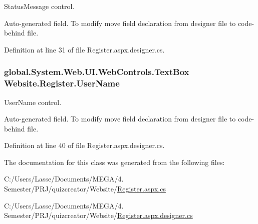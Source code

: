 Status\+Message control. 

Auto-\/generated field. To modify move field declaration from designer file to code-\/behind file. 

Definition at line 31 of file Register.\+aspx.\+designer.\+cs.

\hypertarget{class_website_1_1_register_a76706d63e50874d2759d6a1977fa5615}{}
\subsubsection[{User\+Name}]{\setlength{\rightskip}{0pt plus 5cm}global.\+System.\+Web.\+U\+I.\+Web\+Controls.\+Text\+Box Website.\+Register.\+User\+Name\hspace{0.3cm}{\ttfamily [protected]}}\label{class_website_1_1_register_a76706d63e50874d2759d6a1977fa5615}


User\+Name control. 

Auto-\/generated field. To modify move field declaration from designer file to code-\/behind file. 

Definition at line 40 of file Register.\+aspx.\+designer.\+cs.



The documentation for this class was generated from the following files\+:\begin{DoxyCompactItemize}
\item 
C\+:/\+Users/\+Lasse/\+Documents/\+M\+E\+G\+A/4. Semester/\+P\+R\+J/quizcreator/\+Website/\hyperlink{_register_8aspx_8cs}{Register.\+aspx.\+cs}\item 
C\+:/\+Users/\+Lasse/\+Documents/\+M\+E\+G\+A/4. Semester/\+P\+R\+J/quizcreator/\+Website/\hyperlink{_register_8aspx_8designer_8cs}{Register.\+aspx.\+designer.\+cs}\end{DoxyCompactItemize}
